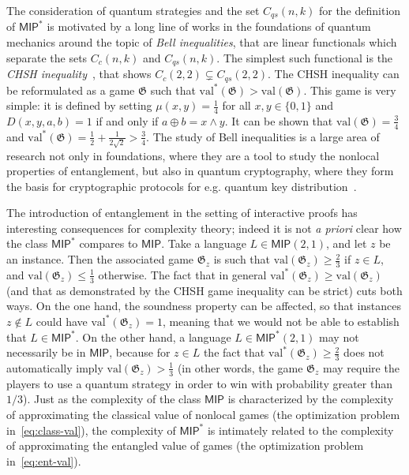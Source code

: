 \documentclass[11pt]{article}
\theoremstyle{definition}
\newcommand{\val}{\ensuremath{\mathrm{val}}}
\newcommand{\game}{\mathfrak{G}}
\newcommand{\class}[1]{\ensuremath{\mathsf{#1}}\xspace}
\newcommand{\MIP}{\class{MIP}} %
\begin{document}
The consideration of quantum strategies and the set $C_{qs}(n,k)$ for the definition of $\MIP^*$ is motivated by a long line of works in the foundations of quantum mechanics around the topic of \emph{Bell inequalities}, that are linear functionals which separate the sets $C_{c}(n,k)$ and $C_{qs}(n,k)$. The simplest such functional is the \emph{CHSH inequality}~\cite{clauser1969proposed}, that shows $C_c(2,2) \subsetneq C_{qs}(2,2)$. The CHSH inequality can be reformulated as a game $\game$ such that $\val^*(\game) > \val(\game)$. This game is very simple: it is defined by setting $\mu(x,y)=\frac{1}{4}$ for all $x,y\in\{0,1\}$ and $D(x,y,a,b)=1$ if and only if $a\oplus b = x\wedge y$. It can be shown that $\val(\game) = \frac{3}{4}$ and $\val^*(\game) = \frac{1}{2} + \frac{1}{2\sqrt{2}} > \frac{3}{4}$. The study of Bell inequalities is a large area of research not only in foundations, where they are a tool to study the nonlocal properties of entanglement, but also in quantum cryptography, where they form the basis for cryptographic protocols for e.g. quantum key distribution~\cite{ekert1991quantum}. 

The introduction of entanglement in the setting of interactive proofs has interesting consequences for complexity theory; indeed it is not \emph{a priori} clear how the class $\MIP^*$ compares to $\MIP$. Take a language $L\in \MIP(2,1)$, and let $z$ be an instance. Then the associated game $\game_z$ is such that $\val(\game_z)\geq\frac{2}{3}$ if $z\in L$, and $\val(\game_z)\leq\frac{1}{3}$ otherwise. The fact that in general $\val^*(\game_z) \geq \val(\game_z)$ (and that as demonstrated by the CHSH game inequality can be strict) cuts both ways. On the one hand, the soundness property can be affected, so that instances $z\notin L$ could have $\val^*(\game_z) = 1$, meaning that we would not be able to establish that $L \in \MIP^*$.
On the other hand, a language $L \in \MIP^*(2,1)$ may not necessarily be in $\MIP$, because for $z\in L$ the fact that $\val^*(\game_z)\geq\frac{2}{3}$ does not automatically imply $\val(\game_z)> \frac{1}{3}$ (in other words, the game $\game_z$ may require the players to use a quantum strategy in order to win with probability greater than $1/3$). Just as the complexity of the class $\MIP$ is characterized by the complexity of approximating the classical value of nonlocal games (the optimization problem in~\eqref{eq:class-val}), the complexity of $\MIP^*$ is intimately related to the complexity of approximating the entangled value of games (the optimization problem in~\eqref{eq:ent-val}).
\end{document}
